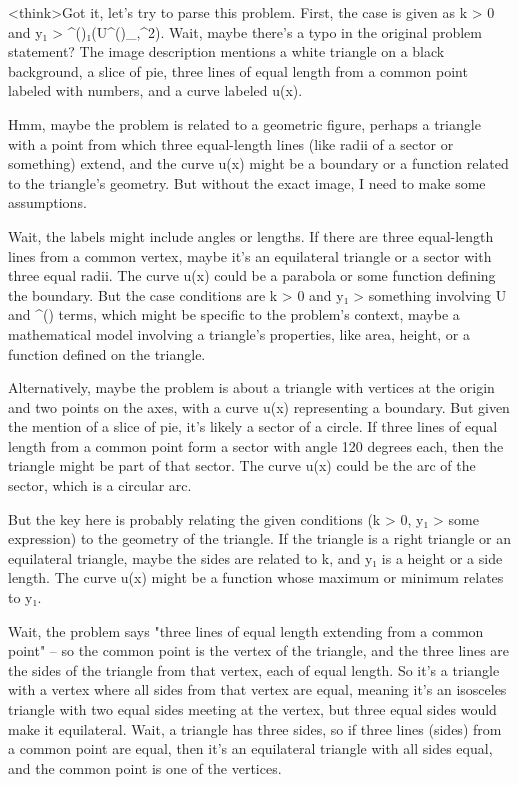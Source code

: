 <think>Got it, let's try to parse this problem. First, the case is given as k > 0 and y₁ > ^()₁(U^()_,^2). Wait, maybe there's a typo in the original problem statement? The image description mentions a white triangle on a black background, a slice of pie, three lines of equal length from a common point labeled with numbers, and a curve labeled u(x). 

Hmm, maybe the problem is related to a geometric figure, perhaps a triangle with a point from which three equal-length lines (like radii of a sector or something) extend, and the curve u(x) might be a boundary or a function related to the triangle's geometry. But without the exact image, I need to make some assumptions. 

Wait, the labels might include angles or lengths. If there are three equal-length lines from a common vertex, maybe it's an equilateral triangle or a sector with three equal radii. The curve u(x) could be a parabola or some function defining the boundary. But the case conditions are k > 0 and y₁ > something involving U and ^() terms, which might be specific to the problem's context, maybe a mathematical model involving a triangle's properties, like area, height, or a function defined on the triangle.

Alternatively, maybe the problem is about a triangle with vertices at the origin and two points on the axes, with a curve u(x) representing a boundary. But given the mention of a slice of pie, it's likely a sector of a circle. If three lines of equal length from a common point form a sector with angle 120 degrees each, then the triangle might be part of that sector. The curve u(x) could be the arc of the sector, which is a circular arc. 

But the key here is probably relating the given conditions (k > 0, y₁ > some expression) to the geometry of the triangle. If the triangle is a right triangle or an equilateral triangle, maybe the sides are related to k, and y₁ is a height or a side length. The curve u(x) might be a function whose maximum or minimum relates to y₁. 

Wait, the problem says "three lines of equal length extending from a common point" – so the common point is the vertex of the triangle, and the three lines are the sides of the triangle from that vertex, each of equal length. So it's a triangle with a vertex where all sides from that vertex are equal, meaning it's an isosceles triangle with two equal sides meeting at the vertex, but three equal sides would make it equilateral. Wait, a triangle has three sides, so if three lines (sides) from a common point are equal, then it's an equilateral triangle with all sides equal, and the common point is one of the vertices. 

